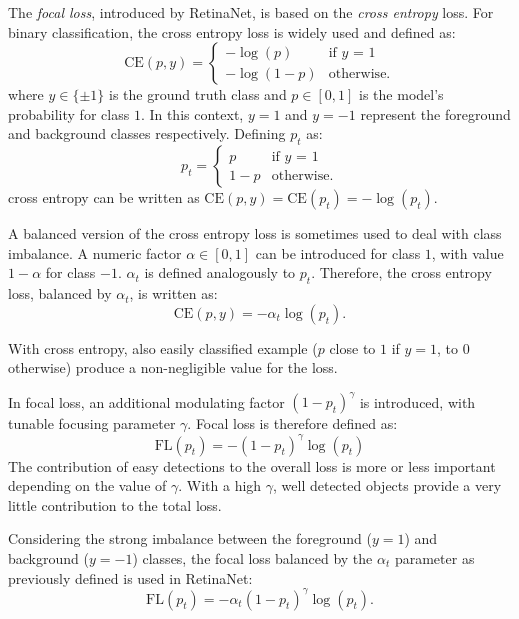 \documentclass[%
    corpo=12pt,
    twoside,
    stile=classica,   
    tipotesi=magistrale,
    evenboxes,
    english,
	numerazioneromana,
]{toptesi}
\begin{document}
\bigskip
The \textit{focal loss}, introduced by RetinaNet, is based on the \textit{cross entropy} loss. For binary classification, the cross entropy loss is widely used and defined as:
\begin{equation}
	\text{CE}(p,y) = \begin{cases}
		-\log(p) & \text{if $y$ = 1}\\
		-\log(1-p) & \text{otherwise.}
	\end{cases}
\end{equation}
where $y\in \{\pm 1\}$ is the ground truth class and $p\in\left[0,1\right]$ is the model's probability for class $1$. In this context, $y=1$ and $y=-1$ represent the foreground and background classes respectively. Defining $p_t$ as:
\begin{equation}
	p_t = \begin{cases}
		p & \text{if $y$ = 1}\\
		1-p & \text{otherwise.}
	\end{cases}
\end{equation}
cross entropy can be written as $\text{CE}(p,y) = \text{CE}(p_t) = -\log(p_t)$.

\bigskip
A balanced version of the cross entropy loss is sometimes used to deal with class imbalance. A numeric factor $\alpha\in\left[0,1\right]$ can be introduced for class $1$, with value $1-\alpha$ for class $-1$. $\alpha_t$ is defined analogously to $p_t$. Therefore, the cross entropy loss, balanced by $\alpha_t$, is written as:
\begin{equation}
	\text{CE}(p,y) = -\alpha_t\log(p_t).
\end{equation}

\bigskip
With cross entropy, also easily classified example ($p$ close to $1$ if $y=1$, to $0$ otherwise) produce a non-negligible value for the loss.

In focal loss, an additional modulating factor $\left(1-p_t\right)^\gamma$ is introduced, with tunable focusing parameter $\gamma$. Focal loss is therefore defined as:
\begin{equation}
	\text{FL}(p_t) = -\left(1-p_t\right)^\gamma \log(p_t)
\end{equation}
The contribution of easy detections to the overall loss is more or less important depending on the value of $\gamma$. With a high $\gamma$, well detected objects provide a very little contribution to the total loss.

Considering the strong imbalance between the foreground ($y=1$) and background ($y=-1$) classes, the focal loss balanced by the $\alpha_t$ parameter as previously defined is used in RetinaNet:
\begin{equation}
	\text{FL}(p_t) = -\alpha_t\left(1-p_t\right)^\gamma \log(p_t).
	\label{eq:focalloss}
\end{equation}
\end{document}
